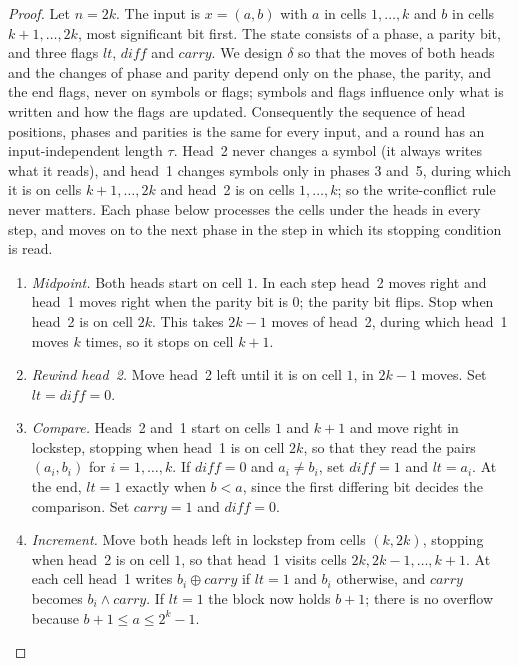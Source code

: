 \documentclass[11pt]{article}
\theoremstyle{definition}
\theoremstyle{remark}
\numberwithin{equation}{section}
\begin{document}
\begin{proof}
Let $n=2k$.  The input is $x=(a,b)$ with $a$ in cells $1,\ldots,k$ and
$b$ in cells $k+1,\ldots,2k$, most significant bit first.  The state
consists of a phase, a parity bit, and three flags $\mathit{lt}$,
$\mathit{diff}$ and $\mathit{carry}$.  We design $\delta$ so that the
moves of both heads and the changes of phase and parity depend only on
the phase, the parity, and the end flags, never on symbols or flags;
symbols and flags influence only what is written and how the flags are
updated.  Consequently the sequence of head positions, phases and
parities is the same for every input, and a round has an
input-independent length $\tau$.  Head~2 never changes a symbol (it
always writes what it reads), and head~1 changes symbols only in phases
3 and~5, during which it is on cells $k+1,\ldots,2k$ and head~2 is on
cells $1,\ldots,k$; so the write-conflict rule never matters.  Each
phase below processes the cells under the heads in every step, and
moves on to the next phase in the step in which its stopping condition
is read.
\begin{enumerate}
\item \emph{Midpoint.}  Both heads start on cell $1$.  In each step
  head~2 moves right and head~1 moves right when the parity bit is $0$;
  the parity bit flips.  Stop when head~2 is on cell $2k$.  This takes
  $2k-1$ moves of head~2, during which head~1 moves $k$ times, so it
  stops on cell $k+1$.
\item \emph{Rewind head~2.}  Move head~2 left until it is on cell $1$,
  in $2k-1$ moves.  Set $\mathit{lt}=\mathit{diff}=0$.
\item \emph{Compare.}  Heads~2 and~1 start on cells $1$ and $k+1$ and
  move right in lockstep, stopping when head~1 is on cell $2k$, so that
  they read the pairs $(a_i,b_i)$ for $i=1,\ldots,k$.  If
  $\mathit{diff}=0$ and $a_i\neq b_i$, set $\mathit{diff}=1$ and
  $\mathit{lt}=a_i$.  At the end, $\mathit{lt}=1$ exactly when $b<a$,
  since the first differing bit decides the comparison.  Set
  $\mathit{carry}=1$ and $\mathit{diff}=0$.
\item \emph{Increment.}  Move both heads left in lockstep from cells
  $(k,2k)$, stopping when head~2 is on cell $1$, so that head~1 visits
  cells $2k,2k-1,\ldots,k+1$.  At each cell head~1 writes
  $b_i\oplus\mathit{carry}$ if $\mathit{lt}=1$ and $b_i$ otherwise, and
  $\mathit{carry}$ becomes $b_i\wedge\mathit{carry}$.  If $\mathit{lt}=1$
  the block now holds $b+1$; there is no overflow because
  $b+1\leq a\leq2^k-1$.

\end{enumerate}
\end{proof}
\end{document}
